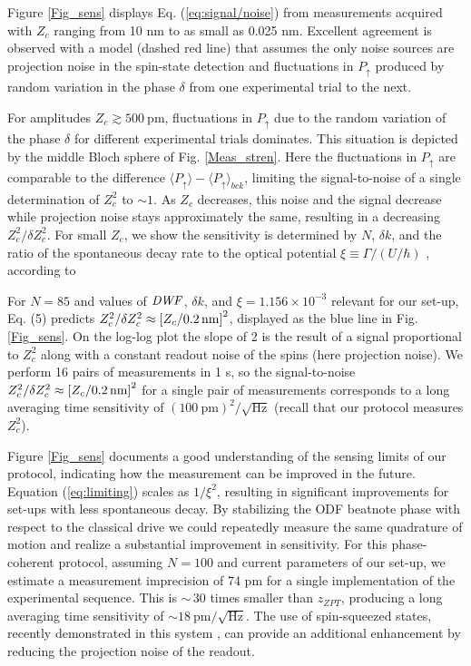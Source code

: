 \documentclass[aps,prl,twocolumn,superscriptaddress,floatfix]{revtex4-1}
\begin{document}
Figure \ref{Fig_sens} displays Eq. (\ref{eq:signal/noise}) from measurements acquired with $Z_{c}$
ranging from 10 nm to as small as 0.025 nm. Excellent agreement is observed with a model (dashed red line) that assumes the only noise sources are projection noise in the spin-state detection and fluctuations in $P_{\uparrow}$ produced by random variation in the phase $\delta$ from one experimental trial to the next.

For amplitudes $Z_{c}\gtrsim 500\:\mathrm{pm}$, fluctuations in $P_{\uparrow}$ due to the random variation of the phase $\delta$ for different experimental trials dominates. This situation is depicted by the middle Bloch sphere of Fig. \ref{Meas_stren}. Here the fluctuations in $P_{\uparrow}$ are comparable to the difference $\langle P_{\uparrow}\rangle - \langle P_{\uparrow} \rangle_{bck}$, limiting the signal-to-noise of a single determination of $Z_{c}^{2}$ to ${\sim} 1$. As $Z_{c}$ decreases, this noise and the signal decrease while projection noise stays approximately the same, resulting
in a decreasing $Z_{c}^{2}/\delta Z_{c}^{2}$. For small $Z_c$, we show the sensitivity is determined by $N$, $\delta k$, and the ratio of the spontaneous decay rate to the optical potential $\xi\equiv\Gamma/\left(U/\hbar\right)$ \citep{SuppMat}, according to

For $N=85$ and values of $\rm{\it{DWF}}$, $\delta k$, and $\xi=1.156\times10^{-3}$ relevant for our set-up, Eq. (5) predicts $Z_c^2/\delta Z_c^2 \approx \left[ Z_c/ 0.2 \, \rm{nm} \right]^2$, displayed as the blue line in Fig. \ref{Fig_sens}. On the log-log plot the slope of 2 is the result of a signal proportional to $Z_c^2$ along with a constant readout noise of the spins (here projection noise). We perform 16 pairs of measurements in 1 s, so the signal-to-noise ${Z_{c}^{2}}/{\delta Z_{c}^{2}} \approx \left[ Z_c/ 0.2 \, \rm{nm} \right]^2$ for a single pair of measurements corresponds to a long averaging time sensitivity of $\left(100\:\mathrm{pm}\right)^{2}/\sqrt{\mathrm{Hz}}$ (recall that our protocol measures $Z_{c}^2$).

Figure \ref{Fig_sens} documents a good understanding of the sensing limits of our protocol, indicating how the measurement can be improved in the future. Equation (\ref{eq:limiting}) scales as $1/\xi^{2}$, resulting in significant improvements for set-ups with less spontaneous decay. By stabilizing the ODF beatnote phase with respect to the classical drive \citep{Hume2011, Biercuk2011} we could repeatedly measure the same quadrature of motion and realize a substantial improvement in sensitivity. For this phase-coherent protocol, assuming $N=100$ and current parameters of our set-up, we estimate \citep{SuppMat} a measurement imprecision of 74 pm for a single implementation of the experimental sequence. This is ${\sim} \,30$ times smaller than $z_{ZPT}$, producing a long averaging time sensitivity of ${\sim}18\:\mathrm{pm/\sqrt{\mathrm{Hz}}}$. The use of spin-squeezed states, recently demonstrated in this system \citep{Bohnet2015}, can provide an additional enhancement by reducing the projection noise of the readout.
\end{document}
